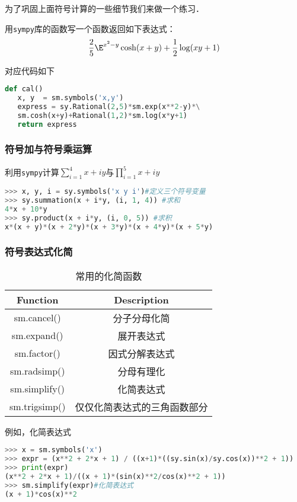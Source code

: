 为了巩固上面符号计算的一些细节我们来做一个练习．
\begin{example}{}
用\verb|sympy|库的函数写一个函数返回如下表达式：
\begin{align}
\frac{2}{5}\E^{x^2-y}\cosh(x+y)+\frac{1}{2}\log(xy+1)
\end{align}


对应代码如下
\begin{lstlisting}[language=python]
def cal()
   x, y  = sm.symbols('x,y')
   express = sy.Rational(2,5)*sm.exp(x**2-y)*\
   sm.cosh(x+y)+Rational(1,2)*sm.log(x*y+1)
   return express

\end{lstlisting}
\end{example}

\subsubsection{符号加与符号乘运算}
利用\verb|sympy|计算$\sum_{i=1}^4{x+iy}$与$\prod_{i=1}^5{x+iy}$
\begin{lstlisting}[language=python]
>>> x, y, i = sy.symbols('x y i')#定义三个符号变量
>>> sy.summation(x + i*y, (i, 1, 4)) #求和
4*x + 10*y
>>> sy.product(x + i*y, (i, 0, 5)) #求积
x*(x + y)*(x + 2*y)*(x + 3*y)*(x + 4*y)*(x + 5*y)
\end{lstlisting}

\subsubsection{符号表达式化简}
\begin{table}[ht]
\centering
\caption{常用的化简函数}\label{SymPy_tab1}
\begin{tabular}{c|c}
Function &Description \\
\hline
sm.cancel() &分子分母化简 \\
\hline
sm.expand() &展开表达式\\
\hline
sm.factor() &因式分解表达式\\
\hline
sm.radsimp() &分母有理化\\
\hline
sm.simplify() &化简表达式\\
\hline
sm.trigsimp() &仅仅化简表达式的三角函数部分\\
\hline
\end{tabular}
\end{table}

例如，化简表达式
\begin{lstlisting}[language=python]
>>> x = sm.symbols('x')
>>> expr = (x**2 + 2*x + 1) / ((x+1)*((sy.sin(x)/sy.cos(x))**2 + 1))
>>> print(expr)
(x**2 + 2*x + 1)/((x + 1)*(sin(x)**2/cos(x)**2 + 1))
>>> sm.simplify(expr)#化简表达式
(x + 1)*cos(x)**2
\end{lstlisting}


